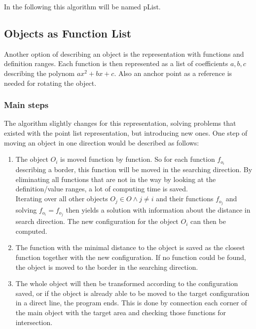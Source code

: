 In the following this algorithm will be named pList.


\subsection{Objects as Function List}
\label{subsec:functionlist}
Another option of describing an object is the representation with functions and definition ranges. Each function is then represented as a list of coefficients $a,b,c$ describing the polynom $ax^2 + bx + c$. Also an anchor point as a reference is needed for rotating the object.\\

\subsubsection{Main steps}
The algorithm slightly changes for this representation, solving problems that existed with the point list representation, but introducing new ones. One step of moving an object in one direction would be described as follows:
\begin{enumerate}
\item The object $O_i$ is moved function by function. So for each function $f_{o_i}$ describing a border, this function will be moved in the searching direction. By eliminating all functions that are not in the way by looking at the definition/value ranges, a lot of computing time is saved.\\ 
Iterating over all other objects $O_j \in O \wedge j \neq i$ and their functions $f_{o_j}$ and solving $f_{o_i} = f_{o_j}$ then yields a solution with information about the distance in search direction. The new configuration for the object $O_i$ can then be computed.
\item The function with the minimal distance to the object is saved as the closest function together with the new configuration. If no function could be found, the object is moved to the border in the searching direction.
\item The whole object will then be transformed according to the configuration saved, or if the object is already able to be moved to the target configuration in a direct line, the program ends. This is done by connection each corner of the main object with the target area and checking those functions for intersection.
\end{enumerate}

